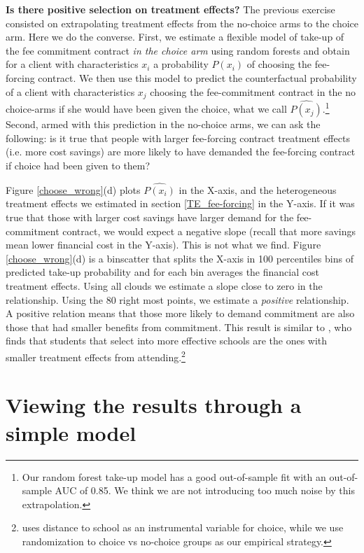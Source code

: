 \documentclass[oneside,11pt]{article}
\begin{document}
    
\vspace{.2in}
\noindent \textbf{Is there positive selection on treatment effects?} The previous exercise consisted on extrapolating treatment effects from the no-choice arms to the choice arm. Here we do the converse. First, we estimate a flexible model of take-up of the fee commitment contract \textit{in the choice arm} using random forests and obtain for a client with characteristics $x_i$ a probability $P(x_i)$ of choosing the fee-forcing contract. We then use this model to predict the counterfactual probability of a client with characteristics $x_j$ choosing the fee-commitment contract in the no choice-arms if she would have been given the choice, what we call $\widehat{P(x_j)}$.\footnote{Our random forest take-up model has a good out-of-sample fit with an out-of-sample AUC of 0.85. We think we are not introducing too much noise by this extrapolation.} Second, armed with this prediction in the no-choice arms, we can ask the following: is it true that people with larger fee-forcing contract treatment effects (i.e. more cost savings) are more likely to have demanded the fee-forcing contract if choice had been given to them? 

Figure \ref{choose_wrong}(d) plots $\widehat{P(x_i)}$ in the X-axis, and the heterogeneous treatment effects we estimated in section \ref{TE_fee-forcing} in the Y-axis. If it was true that those with larger cost savings have larger demand for the fee-commitment contract, we would expect a negative slope (recall that more savings mean lower financial cost in the Y-axis). This is not what we find. Figure \ref{choose_wrong}(d) is a binscatter that splits the X-axis in 100 percentiles bins of predicted take-up probability and for each bin averages the financial cost treatment effects. Using all clouds we estimate a slope close to zero in the relationship. Using the 80 right most points, we estimate a \textit{positive} relationship. A positive relation means that those more likely to demand commitment are also those that had smaller benefits from commitment. This result is similar to \cite{Walters}, who finds that students that select into more effective schools are the ones with smaller treatment effects from attending.\footnote{\cite{Walters} uses distance to school as an instrumental variable for choice, while we use randomization to choice vs no-choice groups as our empirical strategy.}




\section{Viewing the results through a simple model} \label{model}
\end{document}
